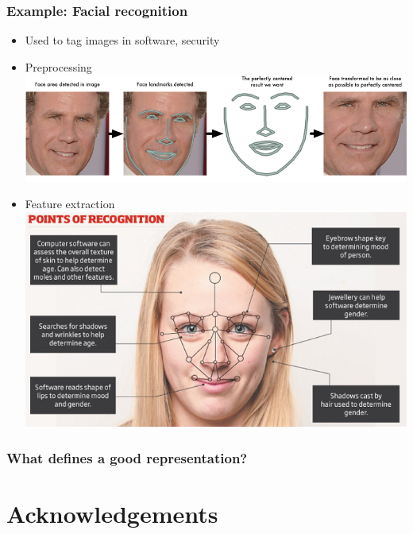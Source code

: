 \documentclass{beamer}
\begin{document}
\begin{frame}
\frametitle{Example: Facial recognition}
\begin{itemize}
\item Used to tag images in software, security \pause
\item Preprocessing
\includegraphics[scale = 0.4]{face_alignment.png}
\pause
\item Feature extraction
\includegraphics[scale = 0.4]{facerec_features.jpg}
\end{itemize}
\end{frame}

\begin{frame}
\frametitle{What defines a good representation?}

\end{frame}


\section*{Acknowledgements}

\begin{frame}
\sectionpage
\end{frame}
\end{document}
